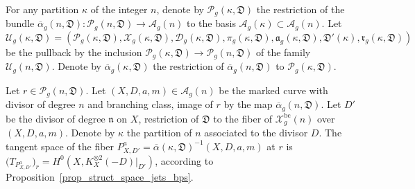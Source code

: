 \documentclass[10pt]{amsart}
\newcommand{\BC}{\mathrm{bc}}
\theoremstyle{definition}
\theoremstyle{plain}
\begin{document}
For any partition $\kappa$ of the integer $n$, denote by $\mathcal P_g(\kappa, \mathfrak D)$ the restriction of the bundle $\overline \alpha_g(n, \mathfrak D): \mathcal P_g(n, \mathfrak D) \to \mathcal A_g(n)$ to the basis $\mathcal A_g(\kappa) \subset \mathcal A_g(n)$.
Let
\[
\mathcal U_g(\kappa, \mathfrak D) = (\mathcal P_g(\kappa, \mathfrak D), \mathcal X_g(\kappa, \mathfrak D), \mathcal D_g(\kappa, \mathfrak D), \pi_g(\kappa, \mathfrak D), \mathfrak a_g(\kappa, \mathfrak D), \mathfrak D'(\kappa), \mathfrak r_g(\kappa, \mathfrak D))
\]
be the pullback by the inclusion $\mathcal P_g(\kappa, \mathfrak D) \to \mathcal P_g(n, \mathfrak D)$ of the family $\mathcal U_g(n, \mathfrak D)$.
Denote by $\overline \alpha_g(\kappa, \mathfrak D)$ the restriction of $\overline \alpha_g(n, \mathfrak D)$ to $\mathcal P_g(\kappa, \mathfrak D)$.

Let $r \in \mathcal P_g(n, \mathfrak D)$.
Let $(X, D, a, m) \in \mathcal A_g(n)$ be the marked curve with divisor of degree $n$ and branching class, image of $r$ by the map $\overline \alpha_g(n, \mathfrak D)$.
Let $D'$ be the divisor of degree $\mathfrak n$ on $X$, restriction of $\mathfrak D$ to the fiber of $\mathcal X_g^{\BC}(n)$ over $(X, D, a, m)$.
Denote by $\kappa$ the partition of $n$ associated to the divisor $D$.
The tangent space of the fiber $P_{X, D'}^a = \overline \alpha(\kappa, \mathfrak D)^{-1}(X, D, a, m)$ at $r$ is $\bigl(T_{P_{X, D'}^a}\bigr)_r = H^0(X, K_X^{\otimes 2}(-D)|_{D'})$, according to Proposition~\ref{prop_struct_space_jets_bps}.
\end{document}
